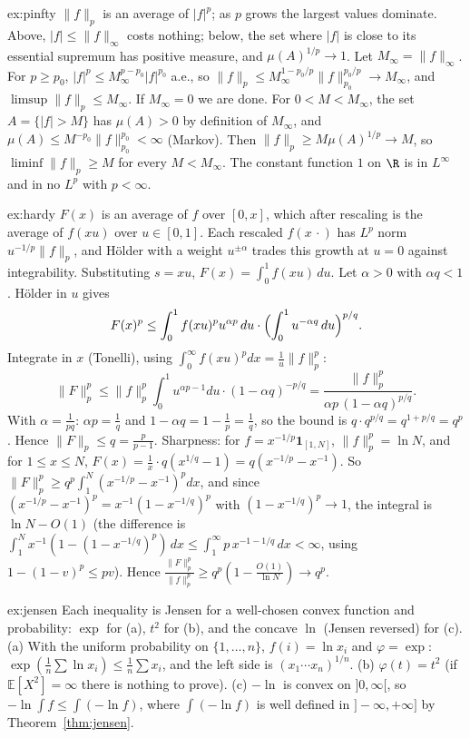 \begin{solution}{ex:pinfty}
\idea $\|f\|_p$ is an average of $|f|^p$; as $p$ grows the largest values dominate. Above, $|f|\le\|f\|_\infty$ costs nothing; below, the set where $|f|$ is close to its essential supremum has positive
measure, and $\mu(A)^{1/p}\to1$.
\writeup Let $M_\infty=\|f\|_\infty$. For $p\ge p_0$, $|f|^p\le M_\infty^{p-p_0}|f|^{p_0}$ a.e., so $\|f\|_p\le M_\infty^{1-p_0/p}\|f\|_{p_0}^{p_0/p}\to M_\infty$, and $\limsup\|f\|_p\le M_\infty$. If $M_\infty=0$ we are done. For
$0<M<M_\infty$, the set $A=\{|f|>M\}$ has $\mu(A)>0$ by definition of $M_\infty$, and $\mu(A)\le M^{-p_0}\|f\|_{p_0}^{p_0}<\infty$ (Markov). Then $\|f\|_p\ge M\mu(A)^{1/p}\to M$, so $\liminf\|f\|_p\ge M$ for every $M<M_\infty$.
The constant function $1$ on $\R$ is in $L^\infty$ and in no $L^p$ with $p<\infty$.
\end{solution}

\begin{solution}{ex:hardy}
\idea $F(x)$ is an average of $f$ over $[0,x]$, which after rescaling is the average of $f(xu)$ over $u\in[0,1]$. Each rescaled $f(x\,\cdot)$ has $L^p$ norm $u^{-1/p}\|f\|_p$, and H\"older with a weight
$u^{\pm\alpha}$ trades this growth at $u=0$ against integrability.
\writeup Substituting $s=xu$, $F(x)=\int_0^1f(xu)\,du$. Let $\alpha>0$ with $\alpha q<1$. H\"older in $u$ gives
\[F(x)^p\le\int_0^1f(xu)^pu^{\alpha p}\,du\cdot\Bigl(\int_0^1u^{-\alpha q}\,du\Bigr)^{p/q}.\]
Integrate in $x$ (Tonelli), using $\int_0^\infty f(xu)^pdx=\frac1u\|f\|_p^p$:
\[\|F\|_p^p\le\|f\|_p^p\int_0^1u^{\alpha p-1}du\cdot(1-\alpha q)^{-p/q}=\frac{\|f\|_p^p}{\alpha p\,(1-\alpha q)^{p/q}}.\]
With $\alpha=\frac1{pq}$: $\alpha p=\frac1q$ and $1-\alpha q=1-\frac1p=\frac1q$, so the bound is $q\cdot q^{p/q}=q^{1+p/q}=q^p$. Hence $\|F\|_p\le q=\frac p{p-1}$. Sharpness: for $f=x^{-1/p}\mathbf 1_{[1,N]}$,
$\|f\|_p^p=\ln N$, and for $1\le x\le N$, $F(x)=\frac1x\cdot q(x^{1/q}-1)=q(x^{-1/p}-x^{-1})$. So $\|F\|_p^p\ge q^p\int_1^N(x^{-1/p}-x^{-1})^pdx$, and since $(x^{-1/p}-x^{-1})^p=x^{-1}(1-x^{-1/q})^p$ with $(1-x^{-1/q})^p\to1$,
the integral is $\ln N-O(1)$ (the difference is $\int_1^Nx^{-1}(1-(1-x^{-1/q})^p)\,dx\le\int_1^\infty p\,x^{-1-1/q}\,dx<\infty$, using $1-(1-v)^p\le pv$). Hence $\frac{\|F\|_p^p}{\|f\|_p^p}\ge q^p(1-\frac{O(1)}{\ln N})\to q^p$.
\end{solution}

\begin{solution}{ex:jensen}
\idea Each inequality is Jensen for a well-chosen convex function and probability: $\exp$ for (a), $t^2$ for (b), and the concave $\ln$ (Jensen reversed) for (c).
\writeup (a) With the uniform probability on $\{1,\dots,n\}$, $f(i)=\ln x_i$ and $\varphi=\exp$: $\exp(\frac1n\sum\ln x_i)\le\frac1n\sum x_i$, and the left side is $(x_1\cdots x_n)^{1/n}$. (b) $\varphi(t)=t^2$ (if $\mathbb E[X^2]=\infty$ there
is nothing to prove). (c) $-\ln$ is convex on $]0,\infty[$, so $-\ln\int f\le\int(-\ln f)$, where $\int(-\ln f)$ is well defined in $]-\infty,+\infty]$ by Theorem~\ref{thm:jensen}.
\end{solution}

